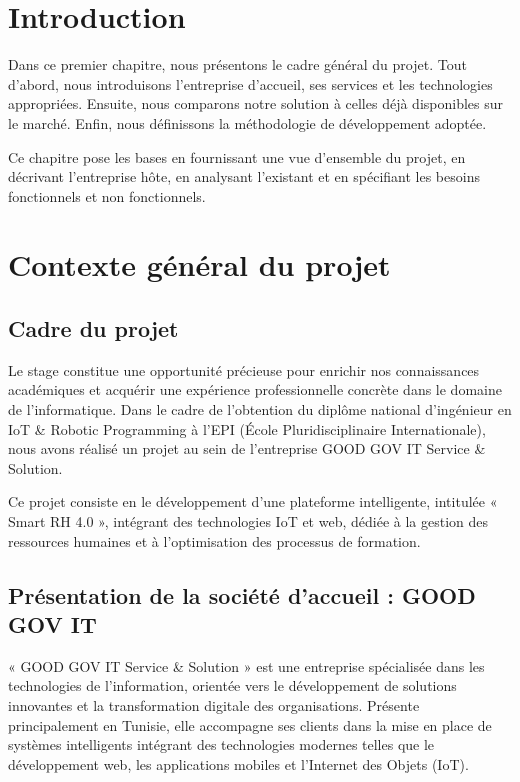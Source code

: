 \section*{Introduction}

Dans ce premier chapitre, nous présentons le cadre général du projet. Tout d'abord, nous introduisons l'entreprise d'accueil, ses services et les technologies appropriées. Ensuite, nous comparons notre solution à celles déjà disponibles sur le marché. Enfin, nous définissons la méthodologie de développement adoptée.

Ce chapitre pose les bases en fournissant une vue d'ensemble du projet, en décrivant l'entreprise hôte, en analysant l'existant et en spécifiant les besoins fonctionnels et non fonctionnels.

\section{Contexte général du projet}

\subsection{Cadre du projet}

Le stage constitue une opportunité précieuse pour enrichir nos connaissances académiques et acquérir une expérience professionnelle concrète dans le domaine de l'informatique. Dans le cadre de l'obtention du diplôme national d'ingénieur en IoT \& Robotic Programming à l'EPI (École Pluridisciplinaire Internationale), nous avons réalisé un projet au sein de l'entreprise GOOD GOV IT Service \& Solution.

Ce projet consiste en le développement d'une plateforme intelligente, intitulée « Smart RH 4.0 », intégrant des technologies IoT et web, dédiée à la gestion des ressources humaines et à l'optimisation des processus de formation.

\subsection{Présentation de la société d'accueil : GOOD GOV IT}

« GOOD GOV IT Service \& Solution » est une entreprise spécialisée dans les technologies de l'information, orientée vers le développement de solutions innovantes et la transformation digitale des organisations. Présente principalement en Tunisie, elle accompagne ses clients dans la mise en place de systèmes intelligents intégrant des technologies modernes telles que le développement web, les applications mobiles et l'Internet des Objets (IoT).

